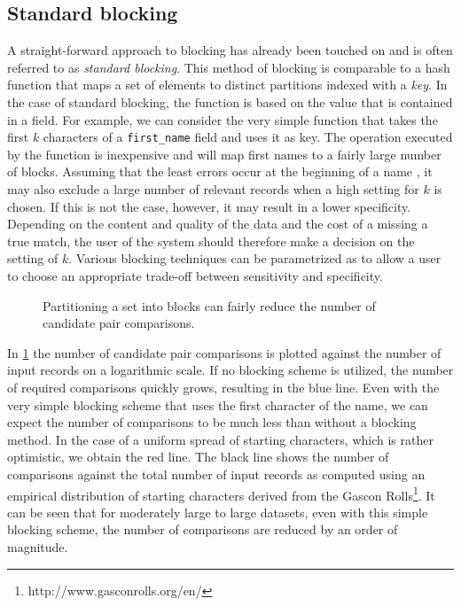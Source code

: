 

\subsection{Standard blocking}
\label{sec:standard_blocking}

A straight-forward approach to blocking has already been touched on and is often referred to as \emph{standard blocking}.
This method of blocking is comparable to a hash function that maps a set of elements to distinct partitions indexed with a \emph{key}.
In the case of standard blocking, the function is based on the value that is contained in a field.
For example, we can consider the very simple function that takes the first $k$ characters of a \verb+first_name+ field and uses it as key.
The operation executed by the function is inexpensive and will map first names to a fairly large number of blocks.
Assuming that the least errors occur at the beginning of a name , it may also exclude a large number of relevant records when a high setting for $k$ is chosen.
If this is not the case, however, it may result in a lower specificity.
Depending on the content and quality of the data and the cost of a missing a true match, the user of the system should therefore make a decision on the setting of $k$.
Various blocking techniques can be parametrized as to allow a user to choose an appropriate trade-off between sensitivity and specificity.

\begin{figure}
    \centering
    
    \caption{Partitioning a set into blocks can fairly reduce the number of candidate pair comparisons.}
    \label{fig:blocking_example}
\end{figure}

In \cref{fig:blocking_example} the number of candidate pair comparisons is plotted against the number of input records on a logarithmic scale.
If no blocking scheme is utilized, the number of required comparisons quickly grows, resulting in the blue line.
Even with the very simple blocking scheme that uses the first character of the name, we can expect the number of comparisons to be much less than without a blocking method.
In the case of a uniform spread of starting characters, which is rather optimistic, we obtain the red line.
The black line shows the number of comparisons against the total number of input records as computed using an empirical distribution of starting characters derived from the Gascon Rolls\footnote{http://www.gasconrolls.org/en/}.
It can be seen that for moderately large to large datasets, even with this simple blocking scheme, the number of comparisons are reduced by an order of magnitude.

